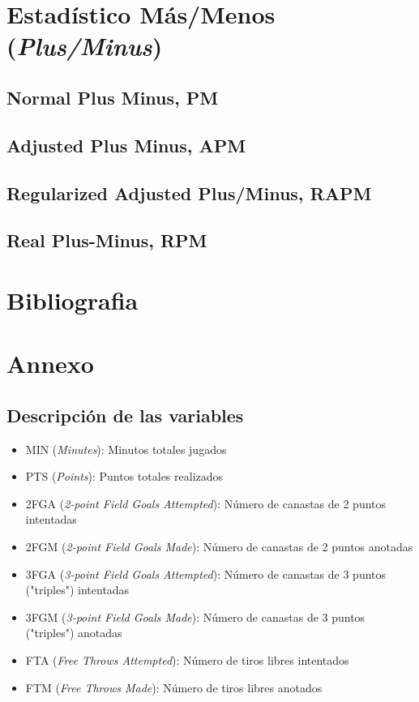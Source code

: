 \documentclass[paper=a4, fontsize=9pt]{article}
\begin{document}
\clearpage

\section{Estadístico Más/Menos (\emph{Plus/Minus})}

\subsection{Normal Plus Minus, PM}

\subsection{Adjusted Plus Minus, APM}

\subsection{Regularized Adjusted Plus/Minus, RAPM}

\subsection{Real Plus-Minus, RPM}

\clearpage


\section{Bibliografia}

\clearpage

\section{Annexo}

\subsection{Descripción de las variables} \label{sec:Annexo1}

\begin{itemize}
\item MIN (\emph{Minutes}): Minutos totales jugados
\item PTS (\emph{Points}): Puntos totales realizados
\item 2FGA (\emph{2-point Field Goals Attempted}): Número de canastas de 2 puntos intentadas
\item 2FGM (\emph{2-point Field Goals Made}): Número de canastas de 2 puntos anotadas
\item 3FGA (\emph{3-point Field Goals Attempted}): Número de canastas de 3 puntos ("triples") intentadas
\item 3FGM (\emph{3-point Field Goals Made}): Número de canastas de 3 puntos ("triples") anotadas
\item FTA (\emph{Free Throws Attempted}): Número de tiros libres intentados
\item FTM (\emph{Free Throws Made}): Número de tiros libres anotados
\end{itemize}
\end{document}

